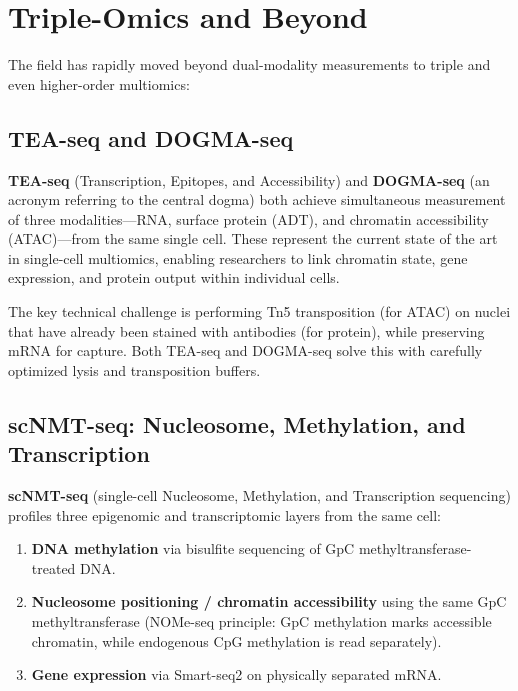 \section{Triple-Omics and Beyond}
\label{sec:multiomics:triple}

The field has rapidly moved beyond dual-modality measurements to triple and even higher-order multiomics:

\subsection{TEA-seq and DOGMA-seq}
\label{subsec:multiomics:tea-dogma}

\textbf{TEA-seq} (Transcription, Epitopes, and Accessibility) and \textbf{DOGMA-seq} (an acronym referring to the central dogma) both achieve simultaneous measurement of three modalities---RNA, surface protein (ADT), and chromatin accessibility (ATAC)---from the same single cell. These represent the current state of the art in single-cell multiomics, enabling researchers to link chromatin state, gene expression, and protein output within individual cells.

The key technical challenge is performing Tn5 transposition (for ATAC) on nuclei that have already been stained with antibodies (for protein), while preserving mRNA for capture. Both TEA-seq and DOGMA-seq solve this with carefully optimized lysis and transposition buffers.

\subsection{scNMT-seq: Nucleosome, Methylation, and Transcription}
\label{subsec:multiomics:scnmt}

\textbf{scNMT-seq} (single-cell Nucleosome, Methylation, and Transcription sequencing) profiles three epigenomic and transcriptomic layers from the same cell:
\begin{enumerate}[itemsep=2pt]
  \item \textbf{DNA methylation} via bisulfite sequencing of GpC methyltransferase-treated DNA.
  \item \textbf{Nucleosome positioning / chromatin accessibility} using the same GpC methyltransferase (NOMe-seq principle: GpC methylation marks accessible chromatin, while endogenous CpG methylation is read separately).
  \item \textbf{Gene expression} via Smart-seq2 on physically separated mRNA.
\end{enumerate}

